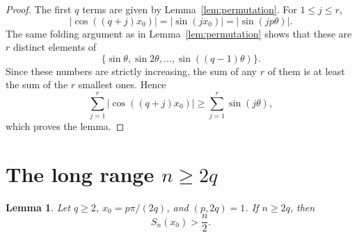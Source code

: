 \documentclass[11pt]{article}
\newtheorem{lemma}{Lemma}
\begin{document}
\begin{proof}
The first \(q\) terms are given by Lemma~\ref{lem:permutation}. For \(1\le j\le r\),
\[
        |\cos((q+j)x_0)|
        =
        |\sin(jx_0)|
        =
        |\sin(jp\theta)|.
\]
The same folding argument as in Lemma~\ref{lem:permutation} shows that these are \(r\) distinct elements of
\[
        \{\sin\theta,\sin2\theta,\dots,\sin((q-1)\theta)\}.
\]
Since these numbers are strictly increasing, the sum of any \(r\) of them is at least the sum of the \(r\) smallest ones. Hence
\[
        \sum_{j=1}^{r}|\cos((q+j)x_0)|
        \ge
        \sum_{j=1}^{r}\sin(j\theta),
\]
which proves the lemma.
\end{proof}

\section{\texorpdfstring{The long range \(n\ge 2q\)}{The long range n >= 2q}}

\begin{lemma}\label{lem:long}
Let \(q\ge2\), \(x_0=p\pi/(2q)\), and \((p,2q)=1\). If \(n\ge2q\), then
\[
        S_n(x_0)>\frac n2.
\]
\end{lemma}
\end{document}
